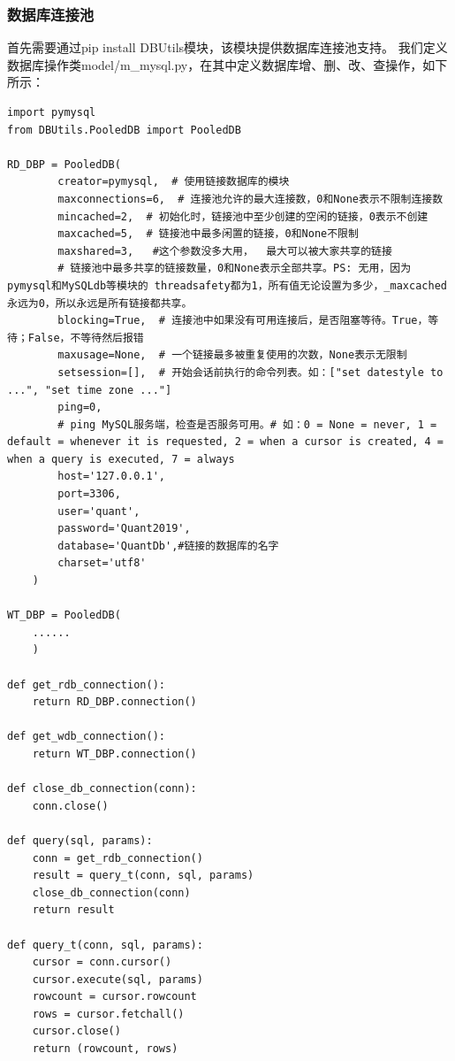 \documentclass{article}
\begin{document}
\subsubsection{数据库连接池}
首先需要通过pip install DBUtils模块，该模块提供数据库连接池支持。\newline
我们定义数据库操作类model/m\_mysql.py，在其中定义数据库增、删、改、查操作，如下所示：
\begin{lstlisting}
import pymysql
from DBUtils.PooledDB import PooledDB

RD_DBP = PooledDB(
        creator=pymysql,  # 使用链接数据库的模块
        maxconnections=6,  # 连接池允许的最大连接数，0和None表示不限制连接数
        mincached=2,  # 初始化时，链接池中至少创建的空闲的链接，0表示不创建
        maxcached=5,  # 链接池中最多闲置的链接，0和None不限制
        maxshared=3,   #这个参数没多大用，  最大可以被大家共享的链接
        # 链接池中最多共享的链接数量，0和None表示全部共享。PS: 无用，因为pymysql和MySQLdb等模块的 threadsafety都为1，所有值无论设置为多少，_maxcached永远为0，所以永远是所有链接都共享。
        blocking=True,  # 连接池中如果没有可用连接后，是否阻塞等待。True，等待；False，不等待然后报错
        maxusage=None,  # 一个链接最多被重复使用的次数，None表示无限制
        setsession=[],  # 开始会话前执行的命令列表。如：["set datestyle to ...", "set time zone ..."]
        ping=0,
        # ping MySQL服务端，检查是否服务可用。# 如：0 = None = never, 1 = default = whenever it is requested, 2 = when a cursor is created, 4 = when a query is executed, 7 = always
        host='127.0.0.1',
        port=3306,
        user='quant',
        password='Quant2019',
        database='QuantDb',#链接的数据库的名字
        charset='utf8'
    )

WT_DBP = PooledDB(
    ......
    )

def get_rdb_connection():
    return RD_DBP.connection()

def get_wdb_connection():
    return WT_DBP.connection()

def close_db_connection(conn):
    conn.close()

def query(sql, params):
    conn = get_rdb_connection()
    result = query_t(conn, sql, params)
    close_db_connection(conn)
    return result

def query_t(conn, sql, params):
    cursor = conn.cursor()
    cursor.execute(sql, params)
    rowcount = cursor.rowcount
    rows = cursor.fetchall()
    cursor.close()
    return (rowcount, rows)
    

\end{lstlisting}
\end{document}
